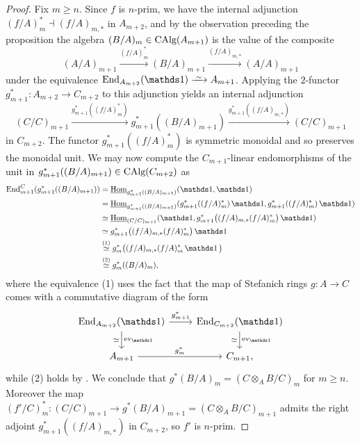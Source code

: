 \documentclass[11pt]{book}
\begin{document}
\begin{proof}
		Fix $m \geq n$. Since $f$ is $n$-prim, we have the internal adjunction $(f/A)^*_m \dashv (f/A)_{m,*}$ in $A_{m+2}$, and by the observation preceding the proposition the algebra $(B/A)_m \in {\textup{CAlg}}(A_{m+1})$ is the value of the composite
		\[
			(A/A)_{m+1} \xrightarrow{(f/A)^*_m} (B/A)_{m+1} \xrightarrow{(f/A)_{m,*}} (A/A)_{m+1}
		\]
		under the equivalence $\End_{A_{m+2}}(\unit) \iso A_{m+1}$. Applying the $2$-functor $g^*_{m+1}\colon A_{m+2} \to C_{m+2}$ to this adjunction yields an internal adjunction
		\[
			(C/C)_{m+1} \xrightarrow{g^*_{m+1}((f/A)^*_m)} g^*_{m+1}((B/A)_{m+1}) \xrightarrow{g^*_{m+1}((f/A)_{m,*})} (C/C)_{m+1}
		\]
		in $C_{m+2}$. The functor $g^*_{m+1}((f/A)^*_m)$ is symmetric monoidal and so preserves the monoidal unit. We may now compute the $C_{m+1}$-linear endomorphisms of the unit in $g^*_{m+1}((B/A)_{m+1}) \in {\textup{CAlg}}(C_{m+2})$ as
		\begin{align*}
			\End^C_{m+1}(g^*_{m+1}((B/A)_{m+1})) &= \underline{\Hom}_{g^*_{m+1}((B/A)_{m+1})}(\unit, \unit) \\
			&= \underline{\Hom}_{g^*_{m+1}((B/A)_{m+1})}(g^*_{m+1}((f/A)^*_m)\unit, g^*_{m+1}((f/A)^*_m)\unit) \\
			&\simeq \underline{\Hom}_{(C/C)_{m+1}}(\unit, g^*_{m+1}\big((f/A)_{m,*}(f/A)^*_m\big)\unit) \\
			&\simeq g^*_{m+1}\big((f/A)_{m,*}(f/A)^*_m\big)\unit \\
			&\overset{(1)}{\simeq} g_m^*\big((f/A)_{m,*}(f/A)^*_m\unit\big) \\
			&\overset{(2)}{\simeq} g_m^*((B/A)_m),
		\end{align*}
		where the equivalence (1) uses the fact that the map of Stefanich rings $g\colon A \to C$ comes with a commutative diagram of the form
		\[
		\begin{tikzcd}
			\End_{A_{m+2}}(\unit) \rar{g^*_{m+1}} \dar{\ev_{\unit}}[swap]{\simeq} & \End_{C_{m+2}}(\unit) \dar{\ev_{\unit}}[swap]{\simeq} \\
			A_{m+1} \rar{g^*_m} & C_{m+1},
		\end{tikzcd}
		\]
		while (2) holds by . 
		We conclude that $g^*(B/A)_m = (C \otimes_A B / C)_m$ for $m \geq n$. Moreover the map $(f'/C)_m^*\colon (C/C)_{m+1} \to g^*(B/A)_{m+1} = (C \otimes_A B / C)_{m+1}$ admits the right adjoint $g^*_{m+1}((f/A)_{m,*})$ in $C_{m+2}$, so $f'$ is $n$-prim.


\end{proof}
\end{document}
